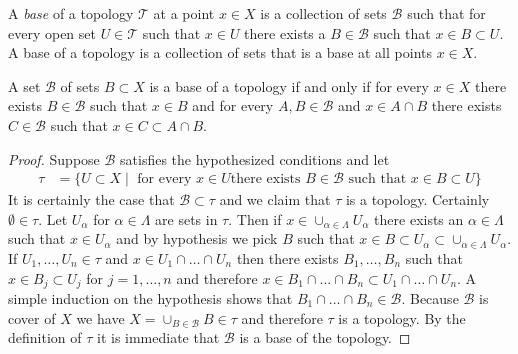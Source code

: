 \begin{defn}A \emph{base} of a topology $\mathcal{T}$ at a point $x
  \in X$ is a collection
  of sets $\mathcal{B}$ such that for every open set $U \in
  \mathcal{T}$ such that $x \in U$ there exists a $B \in \mathcal{B}$ such
  that $x \in B \subset U$.  A base of a topology is a collection of
  sets that is a base at all points $x \in X$.
\end{defn}

\begin{lem}A set $\mathcal{B}$ of sets $B \subset X$ is a base of a
  topology if and only if for every $x \in X$ there exists $B \in
  \mathcal{B}$ such that $x \in B$ and for every $A, B \in
  \mathcal{B}$ and $x \in A \cap B$ there exists $C \in \mathcal{B}$
  such that $x \in C \subset A \cap B$.
\end{lem}
\begin{proof}
Suppose $\mathcal{B}$ satisfies the hypothesized conditions and let
\begin{align*}
\tau &= \lbrace U \subset X \mid \text { for every } x \in U \text{
  there exists } B \in \mathcal{B} \text{ such that } x \in B \subset
U \rbrace
\end{align*}
It is certainly the case that $\mathcal{B}\subset \tau$ and we claim that $\tau$ is a topology.  Certainly $\emptyset \in \tau$.
Let $U_\alpha$ for $\alpha \in \Lambda$ are sets in $\tau$.
Then if $x \in \cup_{\alpha \in \Lambda} U_\alpha$ there exists an
$\alpha \in \Lambda$ such that $x \in U_\alpha$ and by hypothesis we
pick $B$ such that $x \in B \subset U_\alpha \subset  \cup_{\alpha \in
  \Lambda} U_\alpha$.  If $U_1, \dotsc, U_n \in \tau$ and $x \in U_1
\cap \dotsc \cap U_n$ then there exists $B_1, \dotsc, B_n$ such that
$x \in B_j \subset U_j$ for $j = 1, \dotsc, n$ and therefore $x \in
B_1 \cap \dotsc \cap B_n \subset U_1 \cap \dotsc \cap U_n$.  A simple
induction on the hypothesis shows that $B_1 \cap \dotsc \cap B_n \in \mathcal{B}$.
Because $\mathcal{B}$ is cover of $X$ we have $X = \cup_{B \in
  \mathcal{B}} B \in \tau$ and therefore $\tau$ is a topology.  By the
definition of $\tau$ it is immediate that $\mathcal{B}$ is a base of
the topology.
\end{proof}


